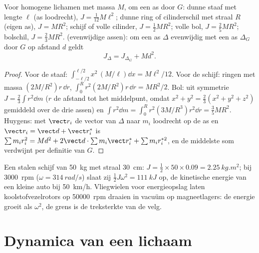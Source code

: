 \begin{proposition}[Traagheidsmomenten]\label{prop:b2:rigid-body-mechanics:inertia}
Voor homogene lichamen met massa $M$, om een as door $G$: dunne staaf met
lengte $\ell$ (as loodrecht), $J = \tfrac1{12}M\ell^2$; dunne ring of
cilinderschil met straal $R$ (eigen as), $J = MR^2$; schijf of volle
cilinder, $J = \tfrac12MR^2$; volle bol, $J = \tfrac25MR^2$; bolschil,
$J = \tfrac23MR^2$. \emph{} (evenwijdige assen): om
een as $\Delta$ evenwijdig met een as $\Delta_G$ door $G$ op afstand $d$
geldt
\[
J_\Delta = J_{\Delta_G} + Md^2 .
\]
\end{proposition}

\begin{proof}
Voor de staaf: $\int_{-\ell/2}^{\ell/2}x^2\,(M/\ell)\dd x = M\ell^2/12$.
Voor de schijf: ringen met massa $(2M/R^2)r\,\dd r$,
$\int_0^R r^2(2M/R^2)r\,\dd r = MR^2/2$.
Bol: uit symmetrie $J = \tfrac23\int r^2\dd m$ ($r$ de afstand tot het
middelpunt, omdat $x^2 + y^2 = \tfrac23(x^2 + y^2 + z^2)$ gemiddeld over de
drie assen) en $\int r^2\dd m = \int_0^R r^2(3M/R^3)r^2\dd r = \tfrac35MR^2$.
Huygens: met $\vect r_i$ de vector van $\Delta$ naar $m_i$ loodrecht op de
as en $\vect r_i = \vect d + \vect r_i^*$ is
$\sum m_ir_i^2 = Md^2
+ 2\vect d\cdot\sum m_i\vect r_i^* + \sum m_ir_i^{*2}$,
en de middelste som
verdwijnt per definitie van $G$.
\end{proof}

\begin{example}\label{ex:b2:rigid-body-mechanics:flywheel}
Een stalen schijf van \qty{50}{kg} met straal \qty{30}{cm}:
$J = \tfrac12 \times
50 \times 0.09 = \qty{2.25}{kg.m^2}$; bij
\qty{3000}{rpm} ($\omega =
\qty{314}{rad/s}$) slaat zij
$\tfrac12J\omega^2 = \qty{111}{kJ}$ op, de
kinetische energie van een kleine auto bij \qty{50}{km/h}. Vliegwielen
voor energieopslag laten koolstofvezelrotors op \qty{50000}{rpm} draaien
in vacuüm op magneetlagers: de energie groeit als $\omega^2$, de grens is
de treksterkte van de velg.
\end{example}

\section{Dynamica van een lichaam}

